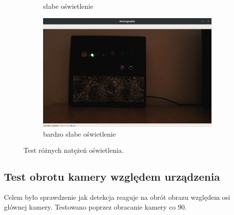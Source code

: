 \documentclass[12pt,twoside,polish]{article}
\begin{document}
\begin{figure}[htb!]
\begin{subfigure}[b]{0.5\textwidth}
		\caption{słabe oświetlenie}
		\label{test_bright2}
	\end{subfigure}
	\begin{subfigure}[b]{0.5\textwidth}
		\includegraphics[width=\textwidth]{test_bright2}
		\caption{bardzo słabe oświetlenie}
		\label{test_bright3}
	\end{subfigure}
	\caption{Test różnych natężeń oświetlenia.}
\end{figure}
\FloatBarrier

\subsection{Test obrotu kamery względem urządzenia}
Celem było sprawdzenie jak detekcja reaguje na obrót obrazu względem osi głównej kamery. Testowano poprzez obracanie kamery co 90\degree.
\end{document}
